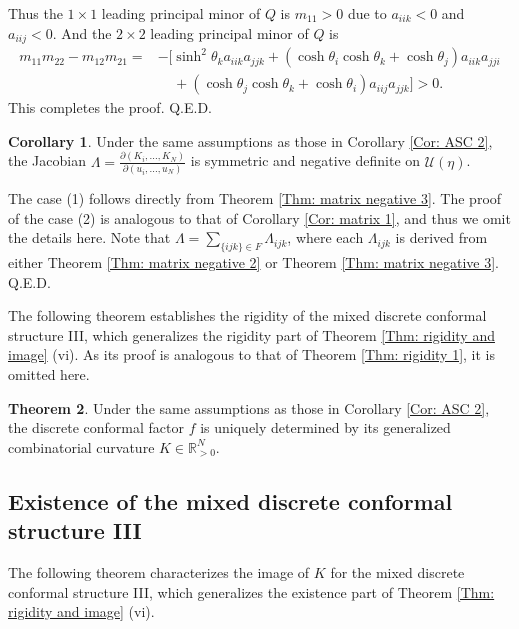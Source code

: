 \documentclass[12pt]{amsart}
\theoremstyle{definition}
\newtheorem{theorem}{Theorem}[section]
\newtheorem{corollary}[theorem]{Corollary}
\def\qed{\hfill{Q.E.D.}\smallskip}
\begin{document}
Thus the $1\times 1$ leading principal minor of $Q$ is $m_{11}>0$ due to $a_{iik}<0$ and $a_{iij}<0$.
And the $2\times 2$ leading principal minor of $Q$ is
\begin{equation*}
\begin{aligned}
m_{11}m_{22}-m_{12}m_{21}
=&-[\sinh^2 \theta_ka_{iik}a_{jjk}
+(\cosh \theta_i\cosh\theta_k+\cosh \theta_j)a_{iik}a_{jji}\\
&\ \ \ \ \ +(\cosh \theta_j\cosh\theta_k+\cosh \theta_i)a_{iij}a_{jjk}]
>0.
\end{aligned}
\end{equation*}
This completes the proof.
\qed

\begin{corollary}
Under the same assumptions as those in Corollary \ref{Cor: ASC 2},
the Jacobian $\Lambda=\frac{\partial (K_i,..., K_N)}{\partial(u_i,...,u_N)}$ is symmetric and negative definite on $\mathcal{U}(\eta)$.
\end{corollary}
\proof
The case (1) follows directly from Theorem \ref{Thm: matrix negative 3}.
The proof of the case (2) is analogous to that of Corollary \ref{Cor: matrix 1}, and thus we omit the details here.
Note that $\Lambda=\sum_{\{ijk\}\in F}\Lambda_{ijk}$,
where each $\Lambda_{ijk}$ is derived from either Theorem \ref{Thm: matrix negative 2} or Theorem \ref{Thm: matrix negative 3}.
\qed

The following theorem establishes the rigidity of the mixed discrete conformal structure III,
which generalizes the rigidity part of Theorem \ref{Thm: rigidity and image} (vi).
As its proof is analogous to that of Theorem \ref{Thm: rigidity 1}, it is omitted here.

\begin{theorem}\label{Thm: rigidity 3}
Under the same assumptions as those in Corollary \ref{Cor: ASC 2},
the discrete conformal factor $f$ is uniquely determined by its generalized combinatorial curvature $K\in \mathbb{R}_{>0}^N$.
\end{theorem}


\subsection{Existence of the mixed discrete conformal structure III}

The following theorem characterizes the image of $K$ for the mixed discrete conformal structure III,
which generalizes the existence part of Theorem \ref{Thm: rigidity and image} (vi).
\end{document}
